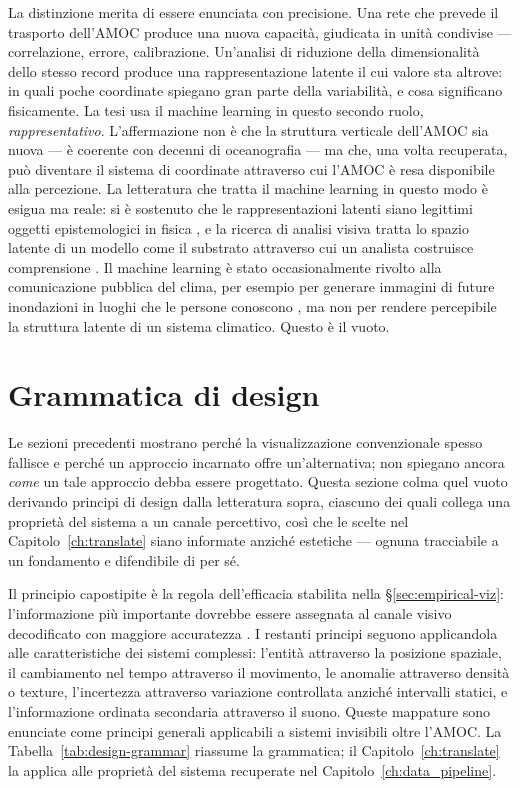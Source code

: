 La distinzione merita di essere enunciata con precisione. Una rete che prevede il trasporto dell'AMOC produce una nuova capacità, giudicata in unità condivise --- correlazione, errore, calibrazione. Un'analisi di riduzione della dimensionalità dello stesso record produce una rappresentazione latente il cui valore sta altrove: in quali poche coordinate spiegano gran parte della variabilità, e cosa significano fisicamente. La tesi usa il machine learning in questo secondo ruolo, \emph{rappresentativo}. L'affermazione non è che la struttura verticale dell'AMOC sia nuova --- è coerente con decenni di oceanografia \citep{hannachi2007, buckley2016} --- ma che, una volta recuperata, può diventare il sistema di coordinate attraverso cui l'AMOC è resa disponibile alla percezione. La letteratura che tratta il machine learning in questo modo è esigua ma reale: si è sostenuto che le rappresentazioni latenti siano legittimi oggetti epistemologici in fisica \citep{iten2020}, e la ricerca di analisi visiva tratta lo spazio latente di un modello come il substrato attraverso cui un analista costruisce comprensione \citep{sacha2018}. Il machine learning è stato occasionalmente rivolto alla comunicazione pubblica del clima, per esempio per generare immagini di future inondazioni in luoghi che le persone conoscono \parencite{schmidt2022}, ma non per rendere percepibile la struttura latente di un sistema climatico. Questo è il vuoto.

\section{Grammatica di design}
\label{sec:design-grammar}

Le sezioni precedenti mostrano perché la visualizzazione convenzionale spesso fallisce e perché un approccio incarnato offre un'alternativa; non spiegano ancora \emph{come} un tale approccio debba essere progettato. Questa sezione colma quel vuoto derivando principi di design dalla letteratura sopra, ciascuno dei quali collega una proprietà del sistema a un canale percettivo, così che le scelte nel Capitolo~\ref{ch:translate} siano informate anziché estetiche --- ognuna tracciabile a un fondamento e difendibile di per sé.

Il principio capostipite è la regola dell'efficacia stabilita nella \S\ref{sec:empirical-viz}: l'informazione più importante dovrebbe essere assegnata al canale visivo decodificato con maggiore accuratezza \citep{bertin1983, clevelandmcgill1984, munzner2014}. I restanti principi seguono applicandola alle caratteristiche dei sistemi complessi: l'entità attraverso la posizione spaziale, il cambiamento nel tempo attraverso il movimento, le anomalie attraverso densità o texture, l'incertezza attraverso variazione controllata anziché intervalli statici, e l'informazione ordinata secondaria attraverso il suono. Queste mappature sono enunciate come principi generali applicabili a sistemi invisibili oltre l'AMOC. La Tabella~\ref{tab:design-grammar} riassume la grammatica; il Capitolo~\ref{ch:translate} la applica alle proprietà del sistema recuperate nel Capitolo~\ref{ch:data_pipeline}.

